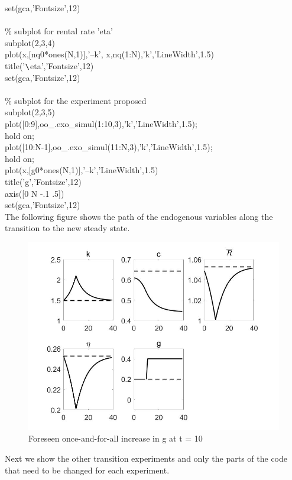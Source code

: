 \documentclass[a4paper,12pt]{scrartcl} %
\begin{document}
set(gca,'Fontsize',12)\\
\\
\% subplot for rental rate 'eta'\\
subplot(2,3,4)\\
plot(x,[nq0*ones(N,1)],'--k', x,nq(1:N),'k','LineWidth',1.5)\\
title('$\verb|\|$eta','Fontsize',12)\\
set(gca,'Fontsize',12)\\
\\
\% subplot for the experiment proposed\\
subplot(2,3,5)\\
plot([0:9],oo\_.exo\_simul(1:10,3),'k','LineWidth',1.5);\\
hold on;\\
plot([10:N-1],oo\_.exo\_simul(11:N,3),'k','LineWidth',1.5);\\
hold on;\\
plot(x,[g0*ones(N,1)],'--k','LineWidth',1.5)\\
title('g','Fontsize',12)\\
axis([0 N -.1 .5])\\
set(gca,'Fontsize',12)\\



The following figure shows the path of the endogenous variables along the transition to the new steady state.

\begin{figure}[htbp!]
		\centering
			\includegraphics[width=0.8\linewidth]{fig12.jpg}
            \caption{Foreseen once-and-for-all increase in g at t = 10}\label{12}
\end{figure}

Next we show the other transition experiments and only the parts of the code that need to be changed for each experiment.
\end{document}
